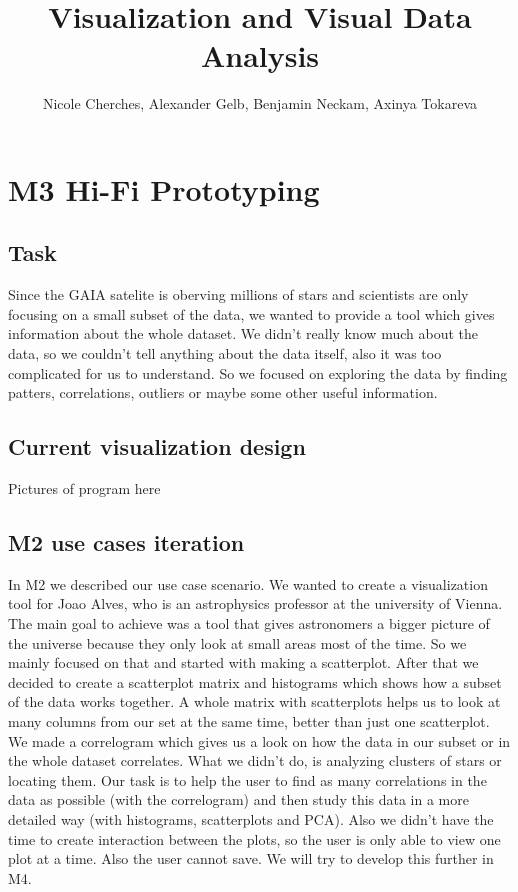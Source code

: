 \documentclass{article}
\begin{document}
\title{Visualization and Visual Data Analysis}
\author{Nicole Cherches, Alexander Gelb, Benjamin Neckam, Axinya Tokareva}
\maketitle
\section{M3  Hi-Fi Prototyping}
\subsection{Task}
Since the GAIA satelite is oberving millions of stars and scientists are only focusing on a small subset of the data, we wanted to provide a tool which gives information about the whole dataset. 
We didn't really know much about the data, so we couldn't tell anything about the data itself, also it was too complicated for us to understand. So we focused on exploring the data by finding patters, correlations, outliers or maybe some other useful information.\\
\subsection{Current visualization design}
{Pictures of program here}
\subsection{M2 use cases iteration}
In M2 we described our use case scenario. We wanted to create a visualization tool for Joao Alves, who is an astrophysics professor at the university of Vienna. The main goal to achieve was a tool that gives astronomers a bigger picture of the universe because they only look at small areas most of the time. So we mainly focused on that and started with making a scatterplot. After that we decided to create a scatterplot matrix and histograms which shows how a subset of the data works together. A whole matrix with scatterplots helps us to look at many columns from our set at the same time, better than just one scatterplot. We made a correlogram which gives us a look on how the data in our subset or in the whole dataset correlates. What we didn't do, is analyzing clusters of stars or locating them. Our task is to help the user to find as many correlations in the data as possible (with the correlogram) and then study this data in a more detailed way (with histograms, scatterplots and PCA). Also we didn't have the time to create interaction between the plots, so the user is only able to view one plot at a time. Also the user cannot save. We will try to develop this further in M4.
\end{document}

